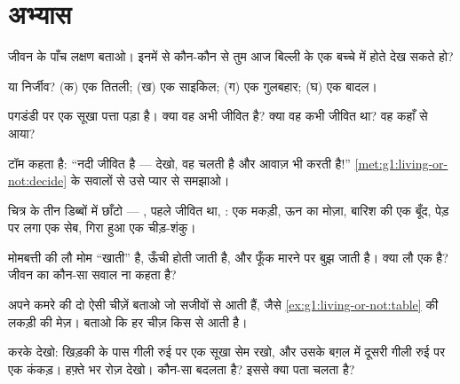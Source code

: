 \section{अभ्यास}

\begin{exercise}[$\star$]\label{exo:g1:living-or-not:1}
जीवन के पाँच लक्षण बताओ। इनमें से कौन-कौन से तुम आज बिल्ली के एक
बच्चे में होते देख सकते हो?
\end{exercise}

\begin{exercise}[$\star$]\label{exo:g1:living-or-not:2}
 या निर्जीव? (क) एक तितली; (ख) एक साइकिल; (ग) एक गुलबहार;
(घ) एक बादल।
\end{exercise}

\begin{exercise}[$\star$]\label{exo:g1:living-or-not:3}
पगडंडी पर एक सूखा पत्ता पड़ा है। क्या वह अभी जीवित है? क्या वह कभी
जीवित था? वह कहाँ से आया?
\end{exercise}

\begin{exercise}[$\star$]\label{exo:g1:living-or-not:4}
टॉम कहता है: ``नदी जीवित है --- देखो, वह चलती है और आवाज़ भी करती
है!'' \cref{met:g1:living-or-not:decide} के सवालों से उसे प्यार से
समझाओ।
\end{exercise}

\begin{exercise}[$\star$]\label{exo:g1:living-or-not:5}
चित्र के तीन डिब्बों में छाँटो --- , पहले जीवित था, : एक मकड़ी, ऊन का मोज़ा, बारिश की एक बूँद, पेड़ पर लगा एक सेब,
गिरा हुआ एक चीड़-शंकु।
\end{exercise}

\begin{exercise}[$\star$]\label{exo:g1:living-or-not:6}
मोमबत्ती की लौ मोम ``खाती'' है, ऊँची होती जाती है, और फूँक मारने पर
बुझ जाती है। क्या लौ एक  है? जीवन का कौन-सा सवाल ना कहता है?
\end{exercise}

\begin{exercise}[$\star$]\label{exo:g1:living-or-not:7}
अपने कमरे की दो ऐसी चीज़ें बताओ जो सजीवों से आती हैं, जैसे
\cref{ex:g1:living-or-not:table} की लकड़ी की मेज़। बताओ कि हर चीज़
किस  से आती है।
\end{exercise}

\begin{exercise}[$\star$]\label{exo:g1:living-or-not:8}
करके देखो: खिड़की के पास गीली रुई पर एक सूखा सेम रखो, और उसके बग़ल में
दूसरी गीली रुई पर एक कंकड़। हफ़्ते भर रोज़ देखो। कौन-सा बदलता है?
इससे क्या पता चलता है?
\end{exercise}

